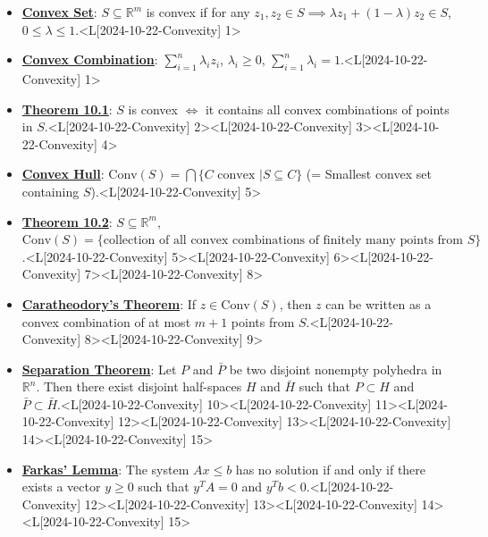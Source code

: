 \documentclass{article}%
\begin{document}
\begin{itemize}[[leftmargin=*]]%
\item \href{https://www.math.purdue.edu/~yipn/421/2024-10-22-Convexity.pdf#page=1}{\textbf{Convex Set}}: $S \subseteq \mathbb{R}^m$ is convex if for any $z_1, z_2 \in S \implies \lambda z_1 + (1-\lambda) z_2 \in S$, $0 \le \lambda \le 1$.<L[2024-10-22-Convexity] 1>%
\item \href{https://www.math.purdue.edu/~yipn/421/2024-10-22-Convexity.pdf#page=1}{\textbf{Convex Combination}}: $\sum_{i=1}^n \lambda_i z_i$, $\lambda_i \ge 0$, $\sum_{i=1}^n \lambda_i = 1$.<L[2024-10-22-Convexity] 1>%
\item \href{https://www.math.purdue.edu/~yipn/421/2024-10-22-Convexity.pdf#page=2}{\textbf{Theorem 10.1}}: $S$ is convex $\iff$ it contains all convex combinations of points in $S$.<L[2024-10-22-Convexity] 2><L[2024-10-22-Convexity] 3><L[2024-10-22-Convexity] 4>%
\item \href{https://www.math.purdue.edu/~yipn/421/2024-10-22-Convexity.pdf#page=5}{\textbf{Convex Hull}}: $\text{Conv}(S) = \bigcap \{C \text{ convex } | S \subseteq C\}$ (= Smallest convex set containing $S$).<L[2024-10-22-Convexity] 5>%
\item \href{https://www.math.purdue.edu/~yipn/421/2024-10-22-Convexity.pdf#page=5}{\textbf{Theorem 10.2}}: $S \subseteq \mathbb{R}^m$, $\text{Conv}(S) = \{\text{collection of all convex combinations of finitely many points from } S\}$.<L[2024-10-22-Convexity] 5><L[2024-10-22-Convexity] 6><L[2024-10-22-Convexity] 7><L[2024-10-22-Convexity] 8>%
\item \href{https://www.math.purdue.edu/~yipn/421/2024-10-22-Convexity.pdf#page=8}{\textbf{Caratheodory's Theorem}}: If $z \in \text{Conv}(S)$, then $z$ can be written as a convex combination of at most $m+1$ points from $S$.<L[2024-10-22-Convexity] 8><L[2024-10-22-Convexity] 9>%
\item \href{https://www.math.purdue.edu/~yipn/421/2024-10-22-Convexity.pdf#page=10}{\textbf{Separation Theorem}}: Let $P$ and $\bar{P}$ be two disjoint nonempty polyhedra in $\mathbb{R}^n$. Then there exist disjoint half-spaces $H$ and $\bar{H}$ such that $P \subset H$ and $\bar{P} \subset \bar{H}$.<L[2024-10-22-Convexity] 10><L[2024-10-22-Convexity] 11><L[2024-10-22-Convexity] 12><L[2024-10-22-Convexity] 13><L[2024-10-22-Convexity] 14><L[2024-10-22-Convexity] 15>%
\item \href{https://www.math.purdue.edu/~yipn/421/2024-10-22-Convexity.pdf#page=12}{\textbf{Farkas' Lemma}}: The system $Ax \le b$ has no solution if and only if there exists a vector $y \ge 0$ such that $y^T A = 0$ and $y^T b < 0$.<L[2024-10-22-Convexity] 12><L[2024-10-22-Convexity] 13><L[2024-10-22-Convexity] 14><L[2024-10-22-Convexity] 15>%
\end{itemize}%
\end{document}
